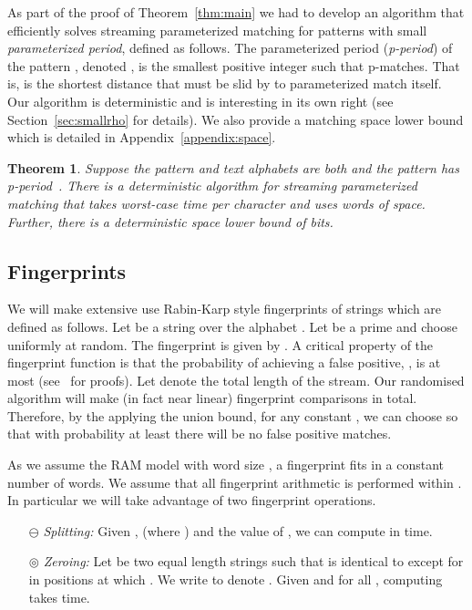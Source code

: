 \documentclass[11pt,a4paper]{article}
\theoremstyle{theorem}
\newtheorem{theorem}{Theorem}[]
\newcommand{\pmatches}{\mbox{p-matches}\xspace}
\newcommand{\pperiod}{\mbox{p-period}\xspace}
\newcommand{\fsplit}{\ensuremath{\ominus}}
\newcommand{\fzero}{\ensuremath{\circledcirc}}
\begin{document}
As part of the proof of Theorem~\ref{thm:main} we had to develop an algorithm that efficiently solves streaming parameterized matching for patterns with small
\emph{parameterized period}, defined as follows. The parameterized period (\emph{\pperiod}) of the pattern , denoted , is the smallest positive integer such that  \pmatches . That is,  is the shortest distance that  must be slid by to parameterized match itself.
Our algorithm is deterministic and is interesting in its own right (see Section~\ref{sec:smallrho} for details). We also provide a matching space lower bound which is detailed in Appendix~\ref{appendix:space}.

\begin{theorem}
    \label{thm:kmp-main}
    Suppose the pattern and text alphabets are both  and the pattern has \pperiod~. There is a deterministic algorithm for streaming parameterized matching that takes  worst-case time per character and uses  words of space. Further, there is a deterministic space lower bound of  bits.
\end{theorem}






\subsection{Fingerprints}
We will make extensive use Rabin-Karp style fingerprints of strings
which are defined as follows. Let  be a string over the alphabet . Let  be a prime and choose
 uniformly at random.  The
fingerprint  is given by . A critical  property of the fingerprint function  is that the probability of achieving a false positive, , is at most  (see~\cite{KR:1987, Porat:09} for proofs). Let  denote the total length of the stream. Our randomised algorithm will make  (in fact near linear) fingerprint comparisons in total. Therefore, by the applying the union bound, for any constant , we can choose  so that with probability at least  there will be no false positive matches.

As we assume the RAM model with word size , a fingerprint fits in a constant number of words. We assume that all fingerprint arithmetic is performed within .
In particular we will take advantage of two fingerprint operations.

\begin{itemize}
\item[\fsplit]   \emph{Splitting:} Given ,  (where ) and the value of , we can compute  in  time.
\item[\fzero] \emph{Zeroing:} Let  be two equal length strings such that  is identical to  except for in positions  at which . We write  to denote . Given  and  for all , computing  takes  time.


\end{itemize}
\end{document}
